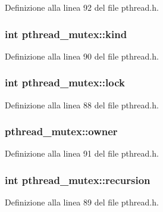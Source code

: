 Definizione alla linea 92 del file pthread.\+h.

\hypertarget{structpthread__mutex_a0a817c827021f648ceba78fb34b61f62}{
\subsubsection[{kind}]{\setlength{\rightskip}{0pt plus 5cm}int pthread\+\_\+mutex\+::kind}}\label{structpthread__mutex_a0a817c827021f648ceba78fb34b61f62}


Definizione alla linea 90 del file pthread.\+h.

\hypertarget{structpthread__mutex_a039843af2bfee5ac32a1c4452108b833}{
\subsubsection[{lock}]{\setlength{\rightskip}{0pt plus 5cm}int pthread\+\_\+mutex\+::lock}}\label{structpthread__mutex_a039843af2bfee5ac32a1c4452108b833}


Definizione alla linea 88 del file pthread.\+h.

\hypertarget{structpthread__mutex_a3d3ee80fcc9a148717677554d05d9d4a}{
\subsubsection[{owner}]{ pthread\+\_\+mutex\+::owner}}\label{structpthread__mutex_a3d3ee80fcc9a148717677554d05d9d4a}


Definizione alla linea 91 del file pthread.\+h.

\hypertarget{structpthread__mutex_ad0a6948ac1d12f9ec3f11fea2ac07ff9}{
\subsubsection[{recursion}]{\setlength{\rightskip}{0pt plus 5cm}int pthread\+\_\+mutex\+::recursion}}\label{structpthread__mutex_ad0a6948ac1d12f9ec3f11fea2ac07ff9}


Definizione alla linea 89 del file pthread.\+h.

